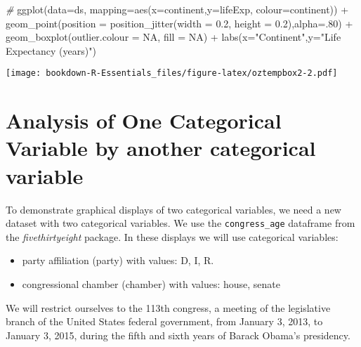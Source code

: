 \documentclass[
]{book}
\newenvironment{Shaded}{\begin{snugshade}}{\end{snugshade}}
\newcommand{\AttributeTok}[1]{\textcolor[rgb]{0.77,0.63,0.00}{#1}}
\newcommand{\CommentTok}[1]{\textcolor[rgb]{0.56,0.35,0.01}{\textit{#1}}}
\newcommand{\ConstantTok}[1]{\textcolor[rgb]{0.00,0.00,0.00}{#1}}
\newcommand{\DecValTok}[1]{\textcolor[rgb]{0.00,0.00,0.81}{#1}}
\newcommand{\FloatTok}[1]{\textcolor[rgb]{0.00,0.00,0.81}{#1}}
\newcommand{\FunctionTok}[1]{\textcolor[rgb]{0.00,0.00,0.00}{#1}}
\newcommand{\NormalTok}[1]{#1}
\newcommand{\SpecialCharTok}[1]{\textcolor[rgb]{0.00,0.00,0.00}{#1}}
\newcommand{\StringTok}[1]{\textcolor[rgb]{0.31,0.60,0.02}{#1}}
\providecommand{\tightlist}{%
  \setlength{\itemsep}{0pt}\setlength{\parskip}{0pt}}
\begin{document}
\begin{Shaded}
\begin{Highlighting}[]
\CommentTok{\# }
\FunctionTok{ggplot}\NormalTok{(}\AttributeTok{data=}\NormalTok{ds, }\AttributeTok{mapping=}\FunctionTok{aes}\NormalTok{(}\AttributeTok{x=}\NormalTok{continent,}\AttributeTok{y=}\NormalTok{lifeExp, }\AttributeTok{colour=}\NormalTok{continent)) }\SpecialCharTok{+} 
  \FunctionTok{geom\_point}\NormalTok{(}\AttributeTok{position =} \FunctionTok{position\_jitter}\NormalTok{(}\AttributeTok{width =} \FloatTok{0.2}\NormalTok{, }\AttributeTok{height =} \FloatTok{0.2}\NormalTok{),}\AttributeTok{alpha=}\NormalTok{.}\DecValTok{80}\NormalTok{) }\SpecialCharTok{+}
 \FunctionTok{geom\_boxplot}\NormalTok{(}\AttributeTok{outlier.colour =} \ConstantTok{NA}\NormalTok{, }\AttributeTok{fill =} \ConstantTok{NA}\NormalTok{) }\SpecialCharTok{+} 
  \FunctionTok{labs}\NormalTok{(}\AttributeTok{x=}\StringTok{"Continent"}\NormalTok{,}\AttributeTok{y=}\StringTok{"Life Expectancy (years)"}\NormalTok{)}
\end{Highlighting}
\end{Shaded}

\texttt{[image: bookdown-R-Essentials\_files/figure-latex/oztempbox2-2.pdf]}

\hypertarget{analysis-of-one-categorical-variable-by-another-categorical-variable}{%
\chapter{Analysis of One Categorical Variable by another categorical variable}\label{analysis-of-one-categorical-variable-by-another-categorical-variable}}

To demonstrate graphical displays of two categorical variables, we need a new dataset with two categorical variables. We use the \texttt{congress\_age} dataframe from the \emph{fivethirtyeight} package. In these displays we will use categorical variables:

\begin{itemize}
\tightlist
\item
  party affiliation (party) with values: D, I, R.
\item
  congressional chamber (chamber) with values: house, senate
\end{itemize}

We will restrict ourselves to the 113th congress, a meeting of the legislative branch of the United States federal government, from January 3, 2013, to January 3, 2015, during the fifth and sixth years of Barack Obama's presidency.
\end{document}
